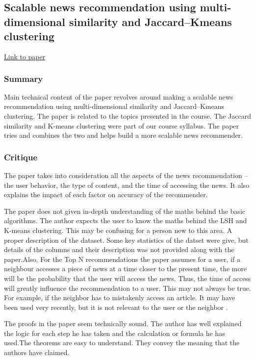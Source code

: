 \documentclass{article}
\begin{document}
\subsection{Scalable news recommendation using multi-dimensional similarity and Jaccard–Kmeans clustering}
\href{https://www-sciencedirect-com.offcampus.lib.washington.edu/science/article/pii/S0164121214001162}{Link to paper}

\subsubsection{Summary}
Main technical content of the paper revolves around making a scalable news recommendation using multi-dimensional similarity and Jaccard–Kmeans clustering. The paper is related to the topics presented in the course. The Jaccard similarity and K-means clustering were part of our course syllabus. The paper tries and combines the two and helps build a more scalable news recommender. 

\subsubsection{Critique}
The paper takes into consideration all the aspects of the news recommendation – the user behavior, the type of content, and the time of accessing the news. It also explains the impact of each factor on accuracy of the recommender. 

The paper does not given in-depth understanding of the maths behind the basic algorithms. The author expects the user to know the maths behind the LSH and K-means clustering. This may be confusing for a person new to this area. A proper description of the dataset. Some key statistics of the datset were give, but details of the columns and their description was not provided along with the paper.Also, For the Top N recommendations the paper assumes for a user, if a neighbour accesses a piece of news at a time closer to the present time, the more will be the probability that the user will access the news. Thus, the time of access will greatly influence the recommendation to a user. This may not always be true. For example, if the neighbor has to mistakenly access an article. It may have been used very recently, but it is not relevant to the user or the neighbor .

The proofs in the paper seem technically sound. The author has well explained the logic for each step he has taken and the calculation or formula he has used.The theorems are easy to understand. They convey the meaning that the authors have claimed.
\end{document}

